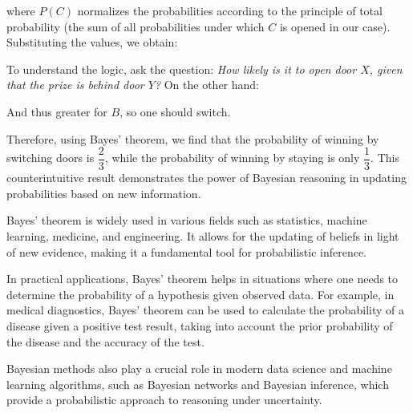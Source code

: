 
where $P(C)$ normalizes the probabilities according to the principle of total probability (the sum of all probabilities under which $C$ is opened in our case). Substituting the values, we obtain:


To understand the logic, ask the question: \textit{How likely is it to open door $X$, given that the prize is behind door $Y$?} On the other hand:



And thus greater for $B$, so one should switch.

Therefore, using Bayes' theorem, we find that the probability of winning by switching doors is $\dfrac{2}{3}$, while the probability of winning by staying is only $\dfrac{1}{3}$. This counterintuitive result demonstrates the power of Bayesian reasoning in updating probabilities based on new information.

Bayes' theorem is widely used in various fields such as statistics, machine learning, medicine, and engineering. It allows for the updating of beliefs in light of new evidence, making it a fundamental tool for probabilistic inference.

In practical applications, Bayes' theorem helps in situations where one needs to determine the probability of a hypothesis given observed data. For example, in medical diagnostics, Bayes' theorem can be used to calculate the probability of a disease given a positive test result, taking into account the prior probability of the disease and the accuracy of the test.

Bayesian methods also play a crucial role in modern data science and machine learning algorithms, such as Bayesian networks and Bayesian inference, which provide a probabilistic approach to reasoning under uncertainty.


